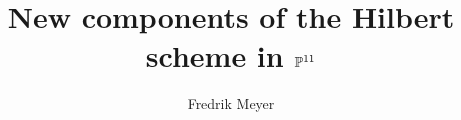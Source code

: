 \documentclass[a4paper]{memoir}
\title{New components of the Hilbert scheme in $\P^{11}$}
\author
{
    Fredrik Meyer
}
\begin{document}
    \frontmatter        %

    \uiotitle

    

    \tableofcontents*    %

    

    \mainmatter         %


    
    
    
        

    \appendix           %
    \appendixpage       %

    
    

    \backmatter         %

    \printbibliography
\end{document}
